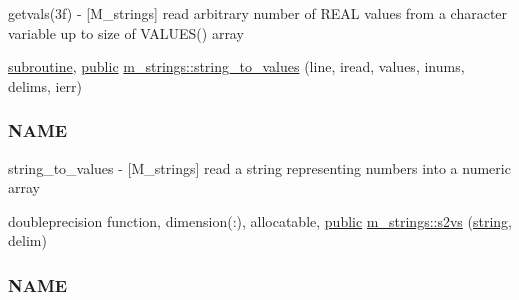 \begin{DoxyCompactItemize}
\begin{DoxyCompactList}
getvals(3f) -\/ \mbox{[}M\+\_\+strings\mbox{]} read arbitrary number of R\+E\+AL values from a character variable up to size of V\+A\+L\+U\+E\+S() array \end{DoxyCompactList}\item 
\hyperlink{M__stopwatch_83_8txt_acfbcff50169d691ff02d4a123ed70482}{subroutine}, \hyperlink{M__stopwatch_83_8txt_a2f74811300c361e53b430611a7d1769f}{public} \hyperlink{namespacem__strings_af3767887ce5c2373a6d9061ea6664bfc}{m\+\_\+strings\+::string\+\_\+to\+\_\+values} (line, iread, values, inums, delims, ierr)
\begin{DoxyCompactList}\small\item\em \subsubsection*{N\+A\+ME}

string\+\_\+to\+\_\+values -\/ \mbox{[}M\+\_\+strings\mbox{]} read a string representing numbers into a numeric array \end{DoxyCompactList}\item 
doubleprecision function, dimension(\+:), allocatable, \hyperlink{M__stopwatch_83_8txt_a2f74811300c361e53b430611a7d1769f}{public} \hyperlink{namespacem__strings_ad7fffe79559a666aa28e1ed598b8670f}{m\+\_\+strings\+::s2vs} (\hyperlink{what__overview_81_8txt_a74cb7e955273b9f9157b4f0c18a38849}{string}, delim)
\begin{DoxyCompactList}\small\item\em \subsubsection*{N\+A\+ME}


\end{DoxyCompactList}
\end{DoxyCompactItemize}
